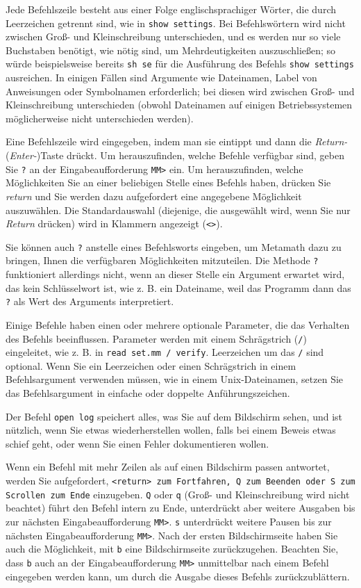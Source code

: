 Jede Befehlszeile besteht aus einer Folge englischsprachiger Wörter, die durch Leerzeichen getrennt sind, wie in \texttt{show settings}.  Bei Befehlswörtern wird nicht zwischen Groß- und Kleinschreibung unterschieden, und es werden nur so viele Buchstaben benötigt, wie nötig sind, um Mehrdeutigkeiten auszuschließen; so würde beispielsweise bereits \texttt{sh se} für die Ausführung des Befehls \texttt{show settings} ausreichen.  In einigen Fällen sind Argumente wie Dateinamen, Label von Anweisungen oder Symbolnamen erforderlich; bei diesen wird zwischen Groß- und Kleinschreibung unterschieden (obwohl Dateinamen auf einigen Betriebssystemen möglicherweise nicht unterschieden werden).

Eine Befehlszeile wird eingegeben, indem man sie eintippt und dann die {\em Return-} ({\em Enter-})Taste drückt.  Um herauszufinden, welche Befehle verfügbar sind, geben Sie \texttt{?} an der Eingabeaufforderung \texttt{MM>} ein.  Um herauszufinden, welche Möglichkeiten Sie an einer beliebigen Stelle eines Befehls haben, drücken Sie {\em return} und Sie werden dazu aufgefordert eine angegebene Möglichkeit auszuwählen.  Die Standardauswahl (diejenige, die ausgewählt wird, wenn Sie nur {\em Return} drücken) wird in Klammern angezeigt (\texttt{<>}).

Sie können auch \texttt{?} anstelle eines Befehlsworts eingeben, um Metamath dazu zu bringen, Ihnen die verfügbaren Möglichkeiten mitzuteilen.  Die Methode \texttt{?} funktioniert allerdings nicht, wenn an dieser Stelle ein Argument erwartet wird, das kein Schlüsselwort ist, wie z. B. ein Dateiname, weil das Programm dann das \texttt{?} als Wert des Arguments interpretiert.

Einige Befehle haben einen oder mehrere optionale Parameter, die das Verhalten des Befehls beeinflussen.  Parameter werden mit einem Schrägstrich (\texttt{/}) eingeleitet, wie z. B. in \texttt{read set.mm / verify}.  Leerzeichen um das \texttt{/} sind optional.  Wenn Sie ein Leerzeichen oder einen Schrägstrich in einem Befehlsargument verwenden müssen, wie in einem Unix-Dateinamen, setzen Sie das Befehlsargument in einfache oder doppelte Anführungszeichen.

Der Befehl \texttt{open log} speichert alles, was Sie auf dem Bildschirm sehen, und ist nützlich, wenn Sie etwas wiederherstellen wollen, falls bei einem Beweis etwas schief geht, oder wenn Sie einen Fehler dokumentieren wollen.

Wenn ein Befehl mit mehr Zeilen als auf einen Bildschirm passen antwortet, werden Sie aufgefordert, \texttt{<return> zum Fortfahren, Q zum Beenden oder S zum Scrollen zum Ende} einzugeben.  \texttt{Q} oder \texttt{q} (Groß- und Kleinschreibung wird nicht beachtet) führt den Befehl intern zu Ende, unterdrückt aber weitere Ausgaben bis zur nächsten Eingabeaufforderung \texttt{MM>}.  \texttt{s} unterdrückt weitere Pausen bis zur nächsten Eingabeaufforderung \texttt{MM>}.  Nach der ersten Bildschirmseite haben Sie auch die Möglichkeit, mit \texttt{b} eine Bildschirmseite zurückzugehen.  Beachten Sie, dass \texttt{b} auch an der Eingabeaufforderung \texttt{MM>} unmittelbar nach einem Befehl eingegeben werden kann, um durch die Ausgabe dieses Befehls zurückzublättern.

